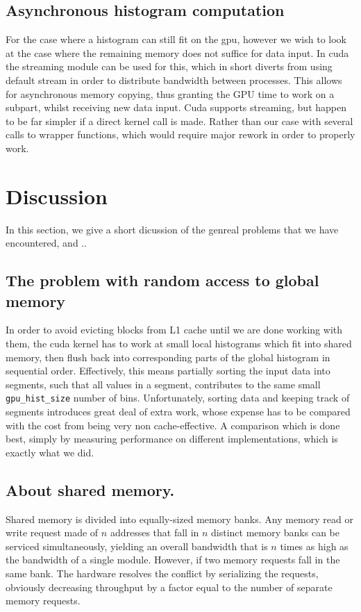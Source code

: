\documentclass[12pt, a4paper, hidelinks]{article}
\renewcommand{\tt}[1]{\texttt{#1}}
\begin{document}
\subsection{Asynchronous histogram computation}
For the case where a histogram can still fit on the gpu, however
we wish to look at the case where the remaining memory does not suffice
for data input.
In cuda the streaming module can be used for this, which in short diverts
from using default stream in order to distribute bandwidth between processes.
This allows for asynchronous memory copying, thus granting the GPU time to
work on a subpart, whilst receiving new data input. Cuda supports streaming,
but happen to be far simpler if a direct kernel call is made. Rather than our
case with several calls to wrapper functions, which would require major
rework in order to properly work.

\section{Discussion}
In this section, we give a short dicussion of the genreal problems that we have encountered,
and ..

\subsection{The problem with random access to global memory}
In order to avoid evicting blocks from L1 cache until we are done working with them,
the cuda kernel has to work at small local histograms which fit into shared memory,
then flush back into corresponding parts of the global histogram
in sequential order. Effectively, this means partially sorting the
input data into segments, such that all values in a segment,
contributes to the same small \tt{gpu\_hist\_size} number of bins.
Unfortunately, sorting data and keeping track of segments
introduces great deal of extra work, whose expense has to be compared
with the cost from being very non cache-effective.
A comparison which is done best,
simply by measuring performance on different implementations,
which is exactly what we did.

\subsection{About shared memory.}
Shared memory is divided into equally-sized memory banks.
Any memory read or write request made of $n$ addresses that fall in $n$
distinct memory banks can be serviced simultaneously, yielding an overall bandwidth
that is $n$ times as high as the bandwidth of a single module.
However, if two memory requests fall in the same bank.
The hardware resolves the conflict by serializing the requests,
obviously decreasing throughput by a factor equal to the number of
separate memory requests.
\end{document}
